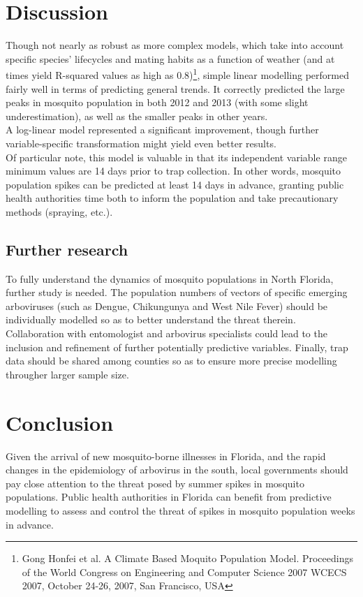 \documentclass{article}
\begin{document}
\begin{multicols}{2}


\section*{Discussion}
Though not nearly as robust as more complex models, which take into account specific species' lifecycles and mating habits as a function of weather (and at times yield R-squared values as high as 0.8)\footnote{Gong Honfei et al. A Climate Based Moquito Population Model. Proceedings of the World Congress on Engineering and Computer Science 2007
WCECS 2007, October 24-26, 2007, San Francisco, USA}, simple linear modelling performed fairly well in terms of predicting general trends.  It correctly predicted the large peaks in mosquito population in both 2012 and 2013 (with some slight underestimation), as well as the smaller peaks in other years.  \\

A log-linear model represented a significant improvement, though further variable-specific transformation might yield even better results. \\

Of particular note, this model is valuable in that its independent variable range minimum values are 14 days prior to trap collection.  In other words, mosquito population spikes can be predicted at least 14 days in advance, granting public health authorities time both to inform the population and take precautionary methods (spraying, etc.).\\

\subsection*{Further research}
To fully understand the dynamics of mosquito populations in North Florida, further study is needed.  The population numbers of vectors of specific emerging arboviruses (such as Dengue, Chikungunya and West Nile Fever) should be individually modelled so as to better understand the threat therein.  Collaboration with entomologist and arbovirus specialists could lead to the inclusion and refinement of further potentially predictive variables.  Finally, trap data should be shared among counties so as to ensure more precise modelling througher larger sample size.

\section*{Conclusion}
Given the arrival of new mosquito-borne illnesses in Florida, and the rapid changes in the epidemiology of arbovirus in the south, local governments should pay close attention to the threat posed by summer spikes in mosquito populations.  Public health authorities in  Florida can benefit from predictive modelling to assess and control the threat of spikes in mosquito population weeks in advance.  

\end{multicols}
 
\end{document}
